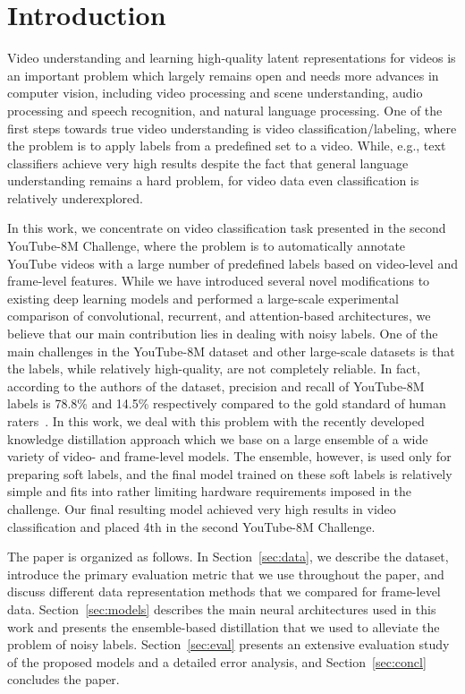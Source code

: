 \documentclass[runningheads]{llncs}
\begin{document}
\section{Introduction}

Video understanding and learning high-quality latent representations for videos is an important problem which largely remains open and needs more advances in computer vision, including video processing and scene understanding, audio processing and speech recognition, and natural language processing. One of the first steps towards true video understanding is video classification/labeling, where the problem is to apply labels from a predefined set to a video. While, e.g., text classifiers achieve very high results despite the fact that general language understanding remains a hard problem, for video data even classification is relatively underexplored.

In this work, we concentrate on video classification task presented in the second YouTube-8M Challenge, where the problem is to automatically annotate YouTube videos with a large number of predefined labels based on video-level and frame-level features. While we have introduced several novel modifications to existing deep learning models and performed a large-scale experimental comparison of convolutional, recurrent, and attention-based architectures, we believe that our main contribution lies in dealing with noisy labels. One of the main challenges in the YouTube-8M dataset and other large-scale datasets is that the labels, while relatively high-quality, are not completely reliable. In fact, according to the authors of the dataset, precision and recall of YouTube-8M labels is 78.8\% and 14.5\% respectively compared to the gold standard of human raters~\cite{DBLP:journals/corr/Abu-El-HaijaKLN16}. In this work, we deal with this problem with the recently developed knowledge distillation approach which we base on a large ensemble of a wide variety of video- and frame-level models. The ensemble, however, is used only for preparing soft labels, and the final model trained on these soft labels is relatively simple and fits into rather limiting hardware requirements imposed in the challenge. Our final resulting model achieved very high results in video classification and placed 4th in the second YouTube-8M Challenge.

The paper is organized as follows. In Section~\ref{sec:data}, we describe the dataset, introduce the primary evaluation metric that we use throughout the paper, and discuss different data representation methods that we compared for frame-level data. Section~\ref{sec:models} describes the main neural architectures used in this work and presents the ensemble-based distillation that we used to alleviate the problem of noisy labels. Section~\ref{sec:eval} presents an extensive evaluation study of the proposed models and a detailed error analysis, and Section~\ref{sec:concl} concludes the paper.
\end{document}
